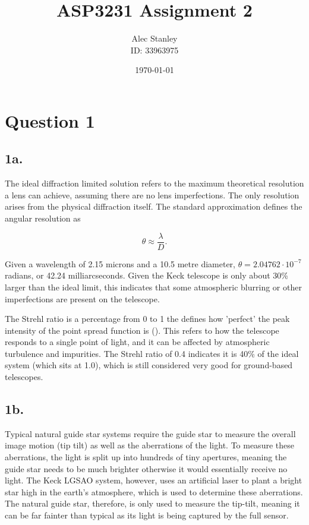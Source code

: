 \documentclass{article}
\title{ASP3231 Assignment 2}
\author{Alec Stanley\\
\vspace{0.1cm}
\small ID: 33963975}
\date{\today}
\begin{document}
\maketitle

\section*{Question 1}

\subsection*{1a.}
The ideal diffraction limited solution refers to the maximum theoretical resolution a lens can achieve, assuming there are no lens imperfections. The only resolution arises from the physical diffraction itself. The standard approximation defines the angular resolution as

\begin{equation}
	\theta\approx\frac{\lambda}{D}.
\end{equation}

Given a wavelength of 2.15 microns and a 10.5 metre diameter, $\theta=2.04762\cdot10^{-7}$ radians, or 42.24 milliarcseconds. Given the Keck telescope is only about 30\% larger than the ideal limit, this indicates that some atmospheric blurring or other imperfections are present on the telescope.

The Strehl ratio is a percentage from 0 to 1 the defines how 'perfect' the peak intensity of the point spread function is (\cite{asp3231}). This refers to how the telescope responds to a single point of light, and it can be affected by atmospheric turbulence and impurities. The Strehl ratio of 0.4 indicates it is 40\% of the ideal system (which sits at 1.0), which is still considered very good for ground-based telescopes.

\subsection*{1b.}
Typical natural guide star systems require the guide star to measure the overall image motion (tip tilt) as well as the aberrations of the light. To measure these aberrations, the light is split up into hundreds of tiny apertures, meaning the guide star needs to be much brighter otherwise it would essentially receive no light. The Keck LGSAO system, however, uses an artificial laser to plant a bright star high in the earth's atmosphere, which is used to determine these aberrations. The natural guide star, therefore, is only used to measure the tip-tilt, meaning it can be far fainter than typical as its light is being captured by the full sensor.
\end{document}
